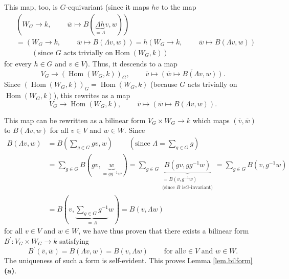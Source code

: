 \documentclass[etingof-lie.tex]{subfiles}
\begin{document}
This map, too, is $G$-equivariant (since it maps $hv$ to the map%
\begin{align*}
&  \left(  W_{G}\rightarrow k,\ \ \ \ \ \ \ \ \ \ \overline{w}\mapsto B\left(
\underbrace{\Lambda h}_{=\Lambda}v,w\right)  \right) \\
&  =\left(  W_{G}\rightarrow k,\ \ \ \ \ \ \ \ \ \ \overline{w}\mapsto
B\left(  \Lambda v,w\right)  \right)  =h\left(  W_{G}\rightarrow
k,\ \ \ \ \ \ \ \ \ \ \overline{w}\mapsto B\left(  \Lambda v,w\right)  \right)
\\
&  \ \ \ \ \ \ \ \ \ \ \left(  \text{since }G\text{ acts trivially on
}\operatorname*{Hom}\left(  W_{G},k\right)  \right)
\end{align*}
for every $h\in G$ and $v\in V$). Thus, it descends to a map%
\[
V_{G}\rightarrow\left(  \operatorname*{Hom}\left(  W_{G},k\right)  \right)
_{G},\ \ \ \ \ \ \ \ \ \ \overline{v}\mapsto\overline{\left(  \overline
{w}\mapsto B\left(  \Lambda v,w\right)  \right)  }.
\]
Since $\left(  \operatorname*{Hom}\left(  W_{G},k\right)  \right)
_{G}=\operatorname*{Hom}\left(  W_{G},k\right)  $ (because $G$ acts trivially
on $\operatorname*{Hom}\left(  W_{G},k\right)  $), this rewrites as a map%
\[
V_{G}\rightarrow\operatorname*{Hom}\left(  W_{G},k\right)
,\ \ \ \ \ \ \ \ \ \ \overline{v}\mapsto\left(  \overline{w}\mapsto B\left(
\Lambda v,w\right)  \right)  .
\]


This map can be rewritten as a bilinear form $V_{G}\times W_{G}\rightarrow k$
which maps $\left(  \overline{v},\overline{w}\right)  $ to $B\left(  \Lambda
v,w\right)  $ for all $v\in V$ and $w\in W$. Since
\begin{align*}
B\left(  \Lambda v,w\right)   &  =B\left(  \sum\limits_{g\in G}gv,w\right)
\ \ \ \ \ \ \ \ \ \ \left(  \text{since }\Lambda=\sum\limits_{g\in G}g\right)
\\
&  =\sum\limits_{g\in G}B\left(  gv,\underbrace{w}_{=gg^{-1}w}\right)
=\sum\limits_{g\in G}\underbrace{B\left(  gv,gg^{-1}w\right)  }%
_{\substack{=B\left(  v,g^{-1}w\right)  \\\text{(since }B\text{ is
}G\text{-invariant)}}}=\sum\limits_{g\in G}B\left(  v,g^{-1}w\right) \\
&  =B\left(  v,\underbrace{\sum\limits_{g\in G}g^{-1}}_{=\Lambda}w\right)
=B\left(  v,\Lambda w\right)
\end{align*}
for all $v\in V$ and $w\in W$, we have thus proven that there exists a
bilinear form $B^{\prime}:V_{G}\times W_{G}\rightarrow k$ satisfying%
\[
B^{\prime}\left(  \overline{v},\overline{w}\right)  =B\left(  \Lambda
v,w\right)  =B\left(  v,\Lambda w\right)  \ \ \ \ \ \ \ \ \ \ \text{for all
}v\in V\text{ and }w\in W\text{.}%
\]
The uniqueness of such a form is self-evident. This proves Lemma
\ref{lem.bilform} \textbf{(a)}.
\end{document}
